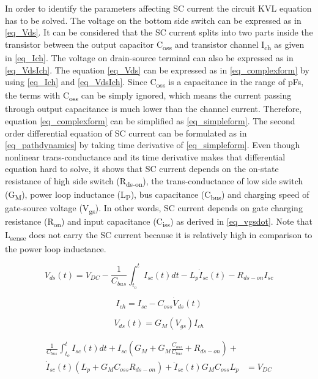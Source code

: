 \documentclass[journal]{IEEEtran}
\begin{document}
In order to identify the parameters affecting SC current the circuit KVL equation has to be solved. The voltage on the bottom side switch can be expressed as in \eqref{eq_Vds}. It can be considered that the SC current splits into two parts inside the transistor between the output capacitor C\textsubscript{oss} and transistor channel I\textsubscript{ch} as given in \eqref{eq_Ich}. The voltage on drain-source terminal can also be expressed as in \eqref{eq_VdsIch}. The equation \eqref{eq_Vds} can be expressed as in \eqref{eq_complexform} by using \eqref{eq_Ich} and \eqref{eq_VdsIch}. Since C\textsubscript{oss} is a capacitance in the range of pFs, the terms with C\textsubscript{oss} can be simply ignored, which means the current passing through output capacitance is much lower than the channel current. Therefore, equation \eqref{eq_complexform} can be simplified as \eqref{eq_simpleform}. The second order differential equation of SC current can be formulated as in \eqref{eq_pathdynamics} by taking time derivative of \eqref{eq_simpleform}. Even though nonlinear trans-conductance and its time derivative makes that differential equation hard to solve, it shows that SC current depends on the on-state resistance of high side switch (R\textsubscript{ds-on}), the trans-conductance of low side switch (G\textsubscript{M}), power loop inductance (L\textsubscript{P}), bus capacitance (C\textsubscript{bus}) and charging speed of gate-source voltage (V\textsubscript{gs}). In other words, SC current depends on gate charging resistance (R\textsubscript{on}) and input capacitance (C\textsubscript{iss}) as derived in \eqref{eq_vgsdot}. Note that L\textsubscript{sense} does not carry the SC current because it is relatively high in comparison to the power loop inductance.

\begin{equation}
\label{eq_Vds}
    V_{ds}(t) = V_{DC} - \frac{1}{C_{bus}}\int_{t_o}^t I_{sc}(t)dt - L_p\dot{I}_{sc}(t) - R_{ds-on} I_{sc}
\end{equation}

\begin{equation}
\label{eq_Ich}
    I_{ch} = I_{sc} - C_{oss}\dot{V}_{ds}(t)
\end{equation}

\begin{equation}
\label{eq_VdsIch}
    {V}_{ds}(t) = G_M(V_{gs}) I_{ch}
\end{equation}

\begin{equation}
\label{eq_complexform}
\begin{split}
    \frac{1}{C_{bus}}\int_{t_o}^t I_{sc}(t)dt + I_{sc} (G_M + G_M \frac{C_{oss}}{C_{bus}} + R_{ds-on}) +
    \\
    \dot{I}_{sc}(t) (L_p + G_M C_{oss} R_{ds-on}) + \ddot{I}_{sc}(t) G_M C_{oss} L_p & = V_{DC}
\end{split}
\end{equation}
\end{document}

